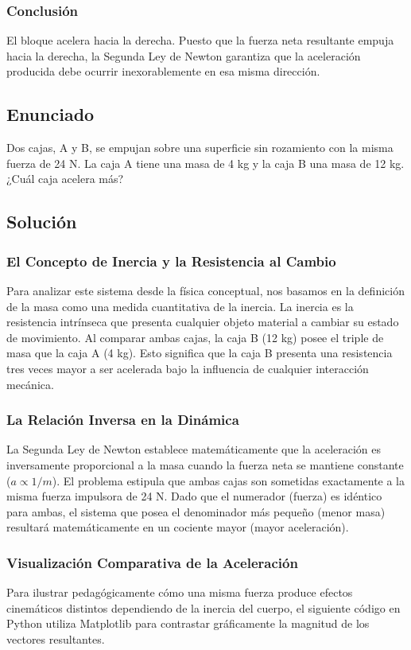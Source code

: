 \documentclass[12pt]{article}
\begin{document}
\subsubsection*{Conclusión}
El bloque acelera hacia la derecha. Puesto que la fuerza neta resultante empuja hacia la derecha, la Segunda Ley de Newton garantiza que la aceleración producida debe ocurrir inexorablemente en esa misma dirección.

\newpage

\subsection*{Enunciado}
Dos cajas, A y B, se empujan sobre una superficie sin rozamiento con la misma fuerza de 24 N. La caja A tiene una masa de 4 kg y la caja B una masa de 12 kg. ¿Cuál caja acelera más?

\subsection*{Solución}

\subsubsection*{El Concepto de Inercia y la Resistencia al Cambio}
Para analizar este sistema desde la física conceptual, nos basamos en la definición de la masa como una medida cuantitativa de la inercia. La inercia es la resistencia intrínseca que presenta cualquier objeto material a cambiar su estado de movimiento. Al comparar ambas cajas, la caja B (12 kg) posee el triple de masa que la caja A (4 kg). Esto significa que la caja B presenta una resistencia tres veces mayor a ser acelerada bajo la influencia de cualquier interacción mecánica.

\subsubsection*{La Relación Inversa en la Dinámica}
La Segunda Ley de Newton establece matemáticamente que la aceleración es inversamente proporcional a la masa cuando la fuerza neta se mantiene constante ($a \propto 1/m$). El problema estipula que ambas cajas son sometidas exactamente a la misma fuerza impulsora de 24 N. Dado que el numerador (fuerza) es idéntico para ambas, el sistema que posea el denominador más pequeño (menor masa) resultará matemáticamente en un cociente mayor (mayor aceleración).

\subsubsection*{Visualización Comparativa de la Aceleración}
Para ilustrar pedagógicamente cómo una misma fuerza produce efectos cinemáticos distintos dependiendo de la inercia del cuerpo, el siguiente código en Python utiliza Matplotlib para contrastar gráficamente la magnitud de los vectores resultantes.
\end{document}
